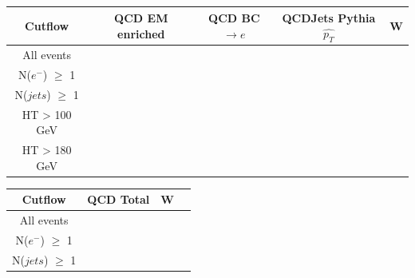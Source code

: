 \documentclass[12pt]{article}
\begin{document}
\begin{table}[h!]
\begin{center}
\begin{tabular}{|c|c|c|c|c|}
\hline
Cutflow & QCD EM enriched & QCD BC$\rightarrow e$ & QCDJets Pythia $\hat{p_{T}}$ &  W \\
\hline
All events & & & & \\
\hline
N($e^{-}$) $\geq$ 1 & & & &\\
\hline
N($jets$) $\geq$ 1 & & & &\\
\hline
HT > 100 GeV & & & &\\
\hline
HT > 180 GeV & & & &\\
\hline

\end{tabular}
\begin{tabular}{|c|c|c|c|}
\hline
Cutflow & QCD Total & W &\\
\hline
All events & & & \\
\hline
N($e^{-}$) $\geq$ 1 & & &\\
\hline
N($jets$) $\geq$ 1 & & &\\
\hline
\end{tabular}

\end{center}

\end{table}
\end{document}
